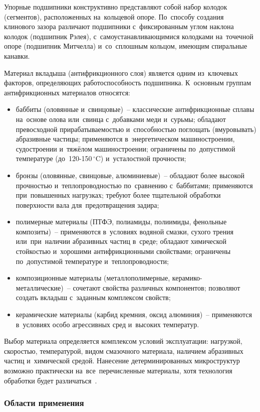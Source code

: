 Упорные подшипники конструктивно представляют собой набор колодок (сегментов), расположенных на~кольцевой опоре. По~способу создания клинового зазора различают подшипники с~фиксированным углом наклона колодок (подшипник Рэлея), с~самоустанавливающимися колодками на~точечной опоре (подшипник Митчелла) и~со~сплошным кольцом, имеющим спиральные канавки.

Материал вкладыша (антифрикционного слоя) является одним из~ключевых факторов, определяющих работоспособность подшипника. К~основным группам антифрикционных материалов относятся:
\begin{itemize}
\item баббиты (оловянные и~свинцовые)~-- классические антифрикционные сплавы на~основе олова или~свинца с~добавками меди и~сурьмы; обладают превосходной прирабатываемостью и~способностью поглощать (вмуровывать) абразивные частицы; применяются в~энергетическом машиностроении, судостроении и~тяжёлом машиностроении; ограничены по~допустимой температуре (до~120-150\,$^{\circ}$C) и~усталостной прочности;
\item бронзы (оловянные, свинцовые, алюминиевые)~-- обладают более высокой прочностью и~теплопроводностью по~сравнению с~баббитами; применяются при~повышенных нагрузках; требуют более тщательной обработки поверхности вала для~предотвращения задира;
\item полимерные материалы (ПТФЭ, полиамиды, полиимиды, фенольные композиты)~-- применяются в~условиях водяной смазки, сухого трения или~при~наличии абразивных частиц в~среде; обладают химической стойкостью и~хорошими антифрикционными свойствами; ограничены по~допустимой температуре и~теплопроводности;
\item композиционные материалы (металлополимерные, керамико-металлические)~-- сочетают свойства различных компонентов; позволяют создать вкладыш с~заданным комплексом свойств;
\item керамические материалы (карбид кремния, оксид алюминия)~-- применяются в~условиях особо агрессивных сред и~высоких температур.
\end{itemize}

Выбор материала определяется комплексом условий эксплуатации: нагрузкой, скоростью, температурой, видом смазочного материала, наличием абразивных частиц и~химической средой. Нанесение детерминированных микроструктур возможно практически на~все~перечисленные материалы, хотя технология обработки будет различаться~\cite{bashmur2023b,petrovsky2020}.

\subsubsection{Области применения}

